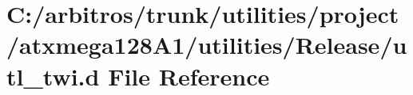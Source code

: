 \hypertarget{utilities_2project_2atxmega128_a1_2utilities_2_release_2utl__twi_8d}{\section{C\-:/arbitros/trunk/utilities/project/atxmega128\-A1/utilities/\-Release/utl\-\_\-twi.d File Reference}
\label{utilities_2project_2atxmega128_a1_2utilities_2_release_2utl__twi_8d}
}
